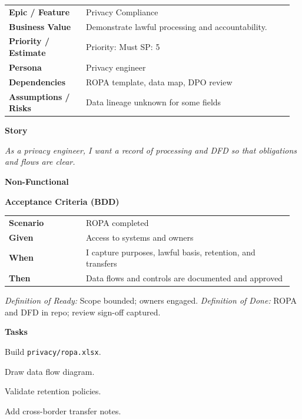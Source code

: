 \documentclass[11pt,letterpaper]{article}
\makeatletter
\newenvironment{kvtable}{%
  \par\noindent\begin{tabular}{@{}>{\raggedright\bfseries\arraybackslash}p{0.26\linewidth} >{\raggedright\arraybackslash}p{0.70\linewidth}@{}}
}{\end{tabular}\par}
\newenvironment{bdd}{%
  \par\noindent\begin{tabular}{@{}>{\raggedright\bfseries\arraybackslash}p{0.26\linewidth} >{\raggedright\arraybackslash}p{0.70\linewidth}@{}}
}{\end{tabular}\par}
\newcommand{\DoRDoD}[2]{%
  \vspace{0.35em}
  {\footnotesize\color{Muted}%
    \textit{Definition of Ready:} #1 \; \textbullet\;
    \textit{Definition of Done:} #2%
  }%
}
\newenvironment{storycard}[2]{%
  \begin{tcolorbox}[cloudcard, title={#1 --- #2}]%
}{\end{tcolorbox}}
\newcommand{\sectionlabel}[1]{\par\vspace{0.35em}\textbf{#1}\par}
\makeatother
\begin{document}
\begin{storycard}{CCS-20}{Ch. 20 — Legal Compliance for Personal Data}
\begin{kvtable}
Epic / Feature & Privacy Compliance\\
Business Value & Demonstrate lawful processing and accountability.\\
Priority / Estimate & Priority: Must \quad SP: 5\\
Persona & Privacy engineer\\
Dependencies & ROPA template, data map, DPO review\\
Assumptions / Risks & Data lineage unknown for some fields\\
\end{kvtable}
\sectionlabel{Story}
\textit{As a privacy engineer, I want a record of processing and DFD so that obligations and flows are clear.}
\sectionlabel{Non-Functional}\;
\sectionlabel{Acceptance Criteria (BDD)}
\begin{bdd}
Scenario & ROPA completed\\
Given & Access to systems and owners\\
When & I capture purposes, lawful basis, retention, and transfers\\
Then & Data flows and controls are documented and approved\\
\end{bdd}
\DoRDoD{Scope bounded; owners engaged.}{ROPA and DFD in repo; review sign-off captured.}
\sectionlabel{Tasks}
\begin{checklist}
\item Build \texttt{privacy/ropa.xlsx}.
\item Draw data flow diagram.
\item Validate retention policies.
\item Add cross-border transfer notes.
\end{checklist}
\end{storycard}
\end{document}
